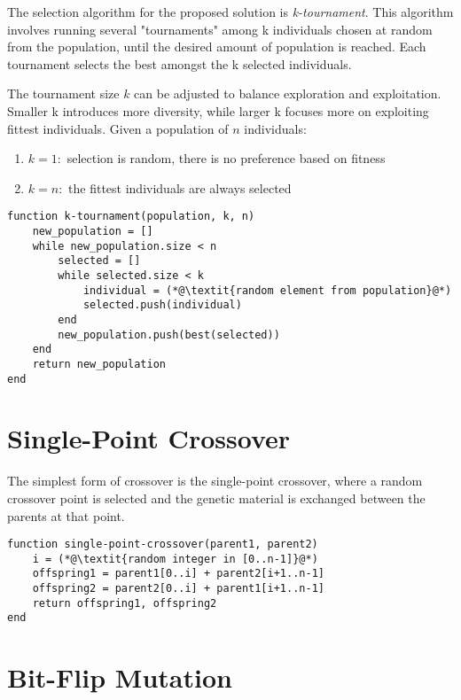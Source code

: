 The selection algorithm for the proposed solution is \emph{k-tournament}.
This algorithm involves running several "tournaments" among k individuals chosen at random from the population, until the desired amount of population is reached. Each tournament selects the best amongst the k selected individuals.

The tournament size $k$ can be adjusted to balance exploration and exploitation. Smaller k introduces more diversity, while larger k focuses more on exploiting fittest individuals.
Given a population of $n$ individuals:
\begin{enumerate}
  \item[] $k=1:$ \quad selection is random, there is no preference based on fitness
  \item[] $k=n:$ \quad the fittest individuals are always selected 
\end{enumerate}

\begin{framed}
\begin{lstlisting}[caption=k-tournament selection]
function k-tournament(population, k, n)
	new_population = []
	while new_population.size < n
		selected = []
		while selected.size < k
			individual = (*@\textit{random element from population}@*)
			selected.push(individual)
		end
		new_population.push(best(selected))
	end
	return new_population
end
\end{lstlisting}
\end{framed}


\section{Single-Point Crossover}

The simplest form of crossover is the single-point crossover, where a random crossover point is selected and the genetic material is exchanged between the parents at that point.

\begin{framed}
\begin{lstlisting}[caption=Single-point crossover]
function single-point-crossover(parent1, parent2)
	i = (*@\textit{random integer in [0..n-1]}@*)
	offspring1 = parent1[0..i] + parent2[i+1..n-1]
	offspring2 = parent2[0..i] + parent1[i+1..n-1]
	return offspring1, offspring2
end
\end{lstlisting}
\end{framed}

\section{Bit-Flip Mutation}

